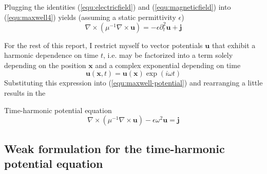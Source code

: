 \documentclass[11pt, a4paper]{article}
\begin{document}
Plugging the identities (\ref{equ:electricfield}) and (\ref{equ:magneticfield})
into (\ref{equ:maxwell4}) yields (assuming a static permittivity $\epsilon$)
\begin{equation}
    \nabla \times (\mu^{-1} \nabla \times \mathbf{u}) = - \epsilon \partial_t^2 \mathbf{u} + \mathbf{j} \label{equ:maxwell-potential}
\end{equation}

For the rest of this report, I restrict myself to vector potentials $\mathbf{u}$
that exhibit a harmonic dependence on time $t$, i.e. may be factorized into
a term solely depending on the position $\mathbf{x}$ and a complex exponential
depending on time
\begin{equation}
    \mathbf{u}(\mathbf{x}, t) = \mathbf{u}(\mathbf{x}) \exp(i \omega t) \label{equ:time-harmonic}
\end{equation}
Substituting this expression into (\ref{equ:maxwell-potential}) and rearranging 
a little results in the
\begin{fancybox}{Time-harmonic potential equation}
    \begin{equation}
     \nabla \times (\mu^{-1} \nabla \times \mathbf{u}) - \epsilon \omega^2 \mathbf{u} = \mathbf{j} \label{equ:maxwell-timeharmonic}
    \end{equation}
\end{fancybox}

\subsection{Weak formulation for the time-harmonic potential equation}
\label{subsec:maxwell-weak}
\end{document}
